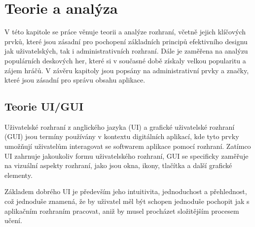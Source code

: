 \chapter{Teorie a analýza}
\label{ch:theory_and_analysis}
V této kapitole se práce věnuje teorii a analýze rozhraní, včetně jejich klíčových prvků, které jsou zásadní pro pochopení základních principů efektivního designu jak uživatelských, tak i administrativních rozhraní. Dále je zaměřena na analýzu populárních deskových her, které si v současné době získaly velkou popularitu a zájem hráčů. V závěru kapitoly jsou popsány na administrativní prvky a značky, které jsou zásadní pro správu obsahu aplikace.

\section{Teorie UI/GUI}
\label{sec:ui-gui-theory}
Uživatelské rozhraní z anglického jazyka \textit{} (UI) a grafické uživatelské rozhraní \textit{} (GUI) jsou termíny používány v kontextu digitálních aplikací, kde tyto prvky umožňují uživatelům interagovat se softwarem aplikace pomocí rozhraní. Zatímco UI zahrnuje jakoukoliv formu uživatelského rozhraní, GUI se specificky zaměřuje na vizuální aspekty rozhraní, jako jsou okna, ikony, tlačítka a další grafické elementy.

Základem dobrého UI je především jeho intuitivita, jednoduchost a přehlednost, což jednoduše znamená, že by uživatel měl být schopen jednoduše pochopit jak s aplikačním rozhraním pracovat, aniž by musel procházet složitějším procesem učení.

